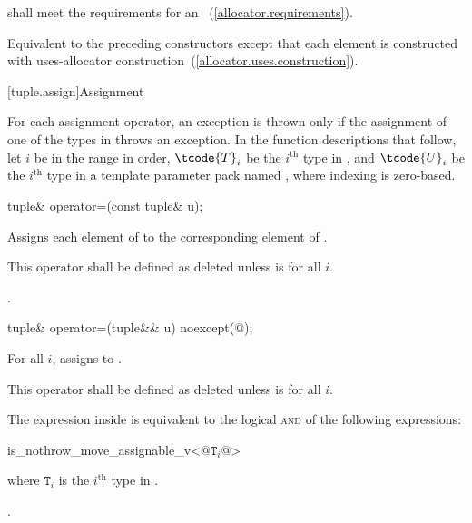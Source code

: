 \begin{itemdescr}
\pnum
\requires {} shall meet the requirements for an
~(\ref{allocator.requirements}).

\pnum
\effects Equivalent to the preceding constructors except that each element is constructed with
uses-allocator construction~(\ref{allocator.uses.construction}).
\end{itemdescr}

[tuple.assign]{Assignment}

\pnum
For each  assignment operator, an exception is thrown only if the
assignment of one of the types in  throws an exception.
In the function descriptions that follow, let $i$ be in the range 
in order, $\tcode{T}_i$ be the $i^\text{th}$ type in ,
and $\tcode{U}_i$ be the $i^\text{th}$ type in a
template parameter pack named , where indexing is zero-based.

%
\begin{itemdecl}
tuple& operator=(const tuple& u);
\end{itemdecl}

\begin{itemdescr}
\pnum
\effects Assigns each element of  to the corresponding
element of .

\pnum
\remarks This operator shall be defined as deleted unless
 is  for all $i$.

\pnum
\returns {}.
\end{itemdescr}

%
\begin{itemdecl}
tuple& operator=(tuple&& u) noexcept(@\seebelow@);
\end{itemdecl}

\begin{itemdescr}
\pnum
\effects For all $i$, assigns  to
.

\pnum
\remarks This operator shall be defined as deleted unless
 is  for all $i$.

\pnum
\remarks The expression inside  is equivalent to the logical \textsc{and} of the
following expressions:

\begin{codeblock}
is_nothrow_move_assignable_v<@$\mathtt{T}_i$@>
\end{codeblock}
where $\mathtt{T}_i$ is the $i^\text{th}$ type in .

\pnum
\returns {}.
\end{itemdescr}

